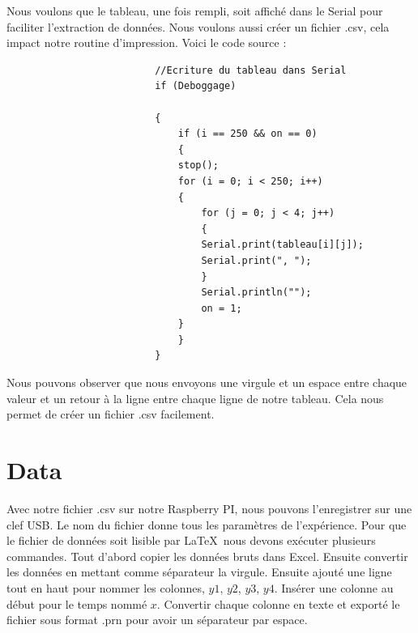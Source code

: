 \documentclass[
	a4paper,									%
	11pt,										%
	twoside,									%
	openright,									%
	notitlepage,									%
	parskip=half,								%
]{scrreprt}										%
\begin{document}
\newpage

Nous voulons que le tableau, une fois rempli, soit affiché dans le Serial pour faciliter l'extraction de données. Nous voulons aussi 
créer un fichier .csv, cela impact notre routine d'impression. Voici le code source : 
\vspace{3em}
\begin{figure}[!h]

    \begin{verbatim}
                    //Ecriture du tableau dans Serial
                    if (Deboggage)
                        
                    {
                        if (i == 250 && on == 0)
                        {
                        stop();
                        for (i = 0; i < 250; i++)
                        {
                            for (j = 0; j < 4; j++)
                            {
                            Serial.print(tableau[i][j]);
                            Serial.print(", ");
                            }
                            Serial.println("");
                            on = 1;
                        }
                        }
                    }
    \end{verbatim}
\end{figure}

Nous pouvons observer que nous envoyons une virgule et un espace entre chaque valeur et un retour à la ligne entre chaque ligne de notre tableau. 
Cela nous permet de créer un fichier .csv facilement. \par

\section{Data}

Avec notre fichier .csv sur notre Raspberry PI, nous pouvons l'enregistrer sur une clef USB. Le nom du fichier donne tous les paramètres 
de l'expérience. Pour que le fichier de données soit lisible par \LaTeX\ nous devons exécuter plusieurs commandes. 
Tout d'abord copier les données bruts dans Excel. Ensuite convertir les données en mettant comme séparateur la 
virgule. Ensuite ajouté une ligne tout en haut pour nommer les colonnes, $y1$, $y2$, $y3$, $y4$. 
Insérer une colonne au début pour le temps nommé $x$. Convertir chaque colonne en texte et exporté le fichier sous 
format .prn pour avoir un séparateur par espace.  \par
\end{document}

